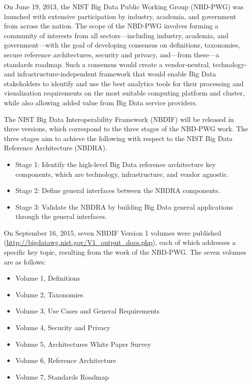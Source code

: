 On June 19, 2013, the NIST Big Data Public Working Group (NBD-PWG) was
launched with extensive participation by industry, academia, and
government from across the nation. The scope of the NBD-PWG involves
forming a community of interests from all sectors—including industry,
academia, and government—with the goal of developing consensus on
definitions, taxonomies, secure reference architectures, security and
privacy, and—from these—a standards roadmap. Such a consensus would
create a vendor-neutral, technology- and infrastructure-independent
framework that would enable Big Data stakeholders to identify and use
the best analytics tools for their processing and visualization
requirements on the most suitable computing platform and cluster,
while also allowing added value from Big Data service providers.

The NIST Big Data Interoperability Framework (NBDIF) will be released
in three versions, which correspond to the three stages of the NBD-PWG
work. The three stages aim to achieve the following with respect to
the NIST Big Data Reference Architecture (NBDRA).

\begin{itemize}

\item Stage 1: Identify the high-level Big Data reference architecture
key components, which are technology, infrastructure, and vendor
agnostic.

\item Stage 2: Define general interfaces between the NBDRA components.

\item Stage 3: Validate the NBDRA by building Big Data general
applications through the general interfaces.
\end{itemize}

On September 16, 2015, seven NBDIF Version 1 volumes were published
(\url{http://bigdatawg.nist.gov/V1_output_docs.php}), each of which
addresses a specific key topic, resulting from the work of the
NBD-PWG. The seven volumes are as follows:

\begin{itemize}
\item	Volume 1, Definitions
\item	Volume 2, Taxonomies 
\item	Volume 3, Use Cases and General Requirements
\item	Volume 4, Security and Privacy 
\item	Volume 5, Architectures White Paper Survey
\item	Volume 6, Reference Architecture
\item	Volume 7, Standards Roadmap
\end{itemize}


